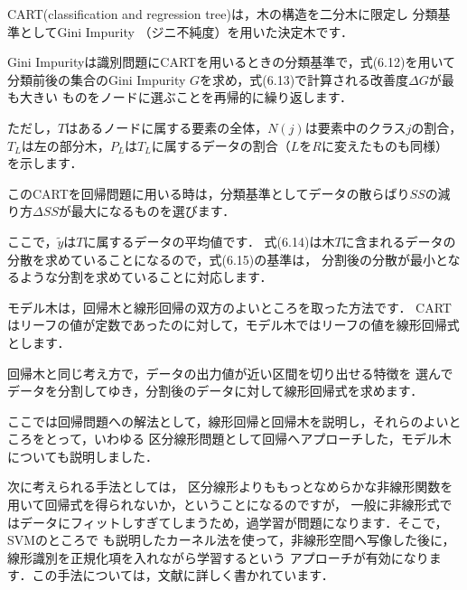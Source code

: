 

CART(classification and regression tree)は，木の構造を二分木に限定し
分類基準としてGini Impurity （ジニ不純度）を用いた決定木です．

Gini Impurityは識別問題にCARTを用いるときの分類基準で，式(6.12)を用いて
分類前後の集合のGini Impurity $G$を求め，式(6.13)で計算される改善度$\Delta G$が最も大きい
ものをノードに選ぶことを再帰的に繰り返します．



ただし，$T$はあるノードに属する要素の全体，$N(j)$は要素中のクラス$j$の割合，$T_L$は左の部分木，$P_L$は$T_L$に属するデータの割合（$L$を$R$に変えたものも同様）
を示します．


このCARTを回帰問題に用いる時は，分類基準としてデータの散らばり$SS$の減り方$\Delta SS$が最大になるものを選びます．



ここで，$\tilde{y}$は$T$に属するデータの平均値です．
式(6.14)は木$T$に含まれるデータの分散を求めていることになるので，式(6.15)の基準は，
分割後の分散が最小となるような分割を求めていることに対応します．


モデル木は，回帰木と線形回帰の双方のよいところを取った方法です．
CARTはリーフの値が定数であったのに対して，モデル木ではリーフの値を線形回帰式
とします．

回帰木と同じ考え方で，データの出力値が近い区間を切り出せる特徴を
選んでデータを分割してゆき，分割後のデータに対して線形回帰式を求めます．


ここでは回帰問題への解法として，線形回帰と回帰木を説明し，それらのよいところをとって，いわゆる
区分線形問題として回帰へアプローチした，モデル木についても説明しました．


次に考えられる手法としては，
区分線形よりももっとなめらかな非線形関数を用いて回帰式を得られないか，ということになるのですが，
一般に非線形式ではデータにフィットしすぎてしまうため，過学習が問題になります．そこで，SVMのところで
も説明したカーネル法を使って，非線形空間へ写像した後に，線形識別を正規化項を入れながら学習するという
アプローチが有効になります．この手法については，文献\cite{akaho08}に詳しく書かれています．

